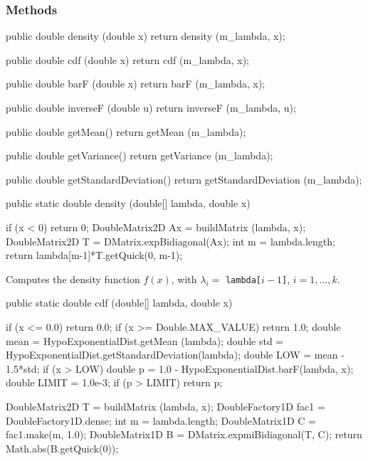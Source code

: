 \subsubsection* {Methods}
\begin{code}\begin{hide}

   public double density (double x) {
      return density (m_lambda, x);
   }

   public double cdf (double x) {
      return cdf (m_lambda, x);
   }

   public double barF (double x) {
      return barF (m_lambda, x);
   }

   public double inverseF (double u) {
      return inverseF (m_lambda, u);
   }

   public double getMean() {
      return getMean (m_lambda);
   }

   public double getVariance() {
      return getVariance (m_lambda);
   }

   public double getStandardDeviation() {
      return getStandardDeviation (m_lambda);
   }\end{hide}

   public static double density (double[] lambda, double x)\begin{hide} {
      if (x < 0)
         return 0;
      DoubleMatrix2D Ax = buildMatrix (lambda, x);
      DoubleMatrix2D T = DMatrix.expBidiagonal(Ax);
      int m = lambda.length;
      return lambda[m-1]*T.getQuick(0, m-1);
   }\end{hide}
\end{code}
\begin{tabb} Computes the density function $f(x)$, with $\lambda_i = $
\texttt{lambda[$i-1$]}, $i = 1,\ldots,k$.
\end{tabb}
\begin{htmlonly}
\end{htmlonly}
\begin{code}

   public static double cdf (double[] lambda, double x)\begin{hide} {
      if (x <= 0.0)
         return 0.0;
      if (x >= Double.MAX_VALUE)
         return 1.0;
      double mean = HypoExponentialDist.getMean (lambda);
      double std = HypoExponentialDist.getStandardDeviation(lambda);
      double LOW = mean - 1.5*std;
      if (x > LOW) {
         double p = 1.0 - HypoExponentialDist.barF(lambda, x);
         double LIMIT = 1.0e-3;
         if (p > LIMIT)
            return p;
      }

      DoubleMatrix2D T = buildMatrix (lambda, x);
      DoubleFactory1D fac1 = DoubleFactory1D.dense;
      int m = lambda.length;
      DoubleMatrix1D C = fac1.make(m, 1.0);
      DoubleMatrix1D B = DMatrix.expmiBidiagonal(T, C);
      return Math.abs(B.getQuick(0));
   }\end{hide}
\end{code}
